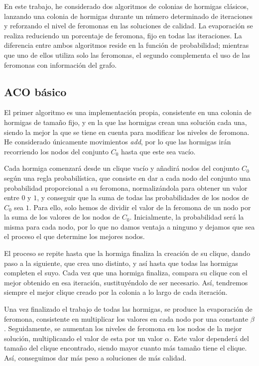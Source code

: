 En este trabajo, he considerado dos algoritmos de colonias de hormigas clásicos,
lanzando una colonia de hormigas durante un número determinado de iteraciones y
reforzando el nivel de feromonas en las soluciones de calidad. La evaporación se
realiza reduciendo un porcentaje de feromona, fijo en todas las iteraciones.
La diferencia entre ambos algoritmos reside en la función de probabilidad;
mientras que uno de ellos utiliza solo las feromonas, el segundo complementa
el uso de las feromonas con información del grafo.

\subsection{ACO básico}\label{aco1}

El primer algoritmo es una implementación propia, consistente en una colonia de
hormigas de tamaño fijo, y en la que las hormigas crean una solución cada una,
siendo la mejor la que se tiene en cuenta para modificar los niveles de feromona.
He considerado únicamente movimientos \textit{add}, por lo que las hormigas irán
recorriendo los nodos del conjunto $C_0$ hasta que este sea vacío.

Cada hormiga comenzará desde un clique vacío y añadirá nodos del conjunto $C_0$ según
una regla probabilística, que consiste en dar a cada nodo del conjunto una probabilidad
proporcional a su feromona, normalizándola para obtener un valor entre $0$ y $1$, y
conseguir que la suma de todas las probabilidades de los nodos de $C_0$ sea $1$.
Para ello,  solo hemos de dividir el valor de la feromona de un nodo por la suma de
los valores de los nodos de $C_0$. Inicialmente, la probabilidad será la misma para
cada nodo,  por lo que no damos ventaja a ninguno y dejamos que sea el proceso el
que determine los mejores nodos.

El proceso se repite hasta que la hormiga finaliza la creación de su clique, dando
paso a la siguiente, que crea uno distinto, y así hasta que todas las hormigas completen
el suyo. Cada vez que una hormiga finaliza, compara su clique con el mejor obtenido
en esa iteración, sustituyéndolo de ser necesario. Así, tendremos siempre el mejor
clique creado por la colonia a lo largo de cada iteración.

Una vez finalizado el trabajo de todas las hormigas, se produce la evaporación de
feromona, consistente en multiplicar los valores en cada nodo por una constante $\beta$.
Seguidamente, se aumentan los niveles de feromona en los nodos de la mejor solución,
multiplicando el valor de esta por un valor $\alpha$. Este valor dependerá del tamaño
del clique encontrado, siendo mayor cuanto más tamaño tiene el clique. Así, conseguimos
dar más peso a soluciones de más calidad.

